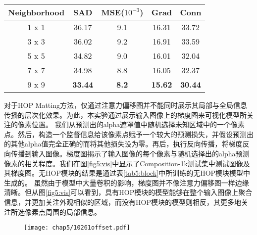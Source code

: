 \begin{table}[t]	
	\setlength{\tabcolsep}{15pt}
	\centering
	\small
	\begin{tabular}{c|cccc}  
		\toprule
		Neighborhood & SAD & MSE($10^{-3}$)& Grad & Conn\\%
		\midrule
		1 x 1 & 36.17& 9.1& 16.31& 33.72 \\  %
		3 x 3 & 36.02& 9.2 & 16.91& 33.59 \\  %
		5 x 5& 34.82& 9.0 & 16.01& 32.04  \\  %
		7 x 7 &34.98&8.8&16.05 & 32.37 \\  %
		9 x 9 &\textbf{33.44}&\textbf{8.2}& \textbf{15.62}&\textbf{30.44}  \\  %
		\bottomrule
	\end{tabular}
	\label{tab5:winsize}
\end{table}

对于HOP Matting方法，仅通过注意力偏移图并不能同时展示其局部与全局信息传播的层次化效果。为此，本实验通过展示输入图像上的梯度图来可视化模型所关注的像素位置。
我们从预测出的alpha遮罩值中随机选择未知区域中的一个像素点。然后，构造一个监督信息给该像素点赋予一个较大的预测损失，并假设预测出的其他alpha值完全正确的而将其他损失设为零。再后，执行反向传播，将梯度反向传播到输入图像。梯度图揭示了输入图像的每个像素与随机选择出的alpha预测像素的相关程度。我们在图\ref{fig5:vis}中显示了Composition-1k测试集\cite{xu2017deep}中测试图像及其梯度图。无HOP模块的结果是通过表\ref{tab5:block}中所训练的无HOP模块模型中生成的。
虽然由于模型中大量卷积的影响，梯度图并不像注意力偏移图一样边缘清晰。但从图\ref{fig5:vis}可以看到，具有HOP模块的模型能够在整个输入图像上聚合信息，并更加关注外观相似的区域，而没有HOP模块的模型则相反，其更多地关注所选像素点周围的局部信息。


\begin{figure}[t]
	\centering
	\texttt{[image: chap5/10261offset.pdf]}
	\label{fig5:offset}
\end{figure}


